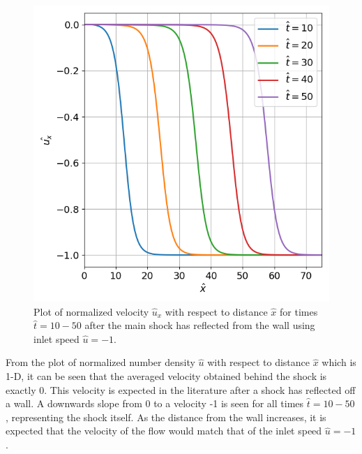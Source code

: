 \documentclass[a4paper]{article}
\begin{document}
\clearpage
\begin{figure}[hbt!]
    \centering
    \includegraphics[width=14cm]{plots/problem_a_u.png}
    \caption{\centering Plot of normalized velocity $\hat{u}_x$ with respect to distance $\hat{x}$ for times $\hat{t} = 10 - 50$ after the main shock has reflected from the wall using inlet speed $\hat{u} = -1$.}
    \label{problem_a_U}
\end{figure}

From the plot of normalized number density $\hat{u}$ with respect to distance $\hat{x}$ which is 1-D, it can be seen that the averaged velocity obtained behind the shock is exactly 0. This velocity is expected in the literature after a shock has reflected off a wall. A downwards slope from 0 to a velocity -1 is seen for all times $\hat{t} = 10 - 50$, representing the shock itself. As the distance from the wall increases, it is expected that the velocity of the flow would match that of the inlet speed $\hat{u} = -1$. 
\end{document}
